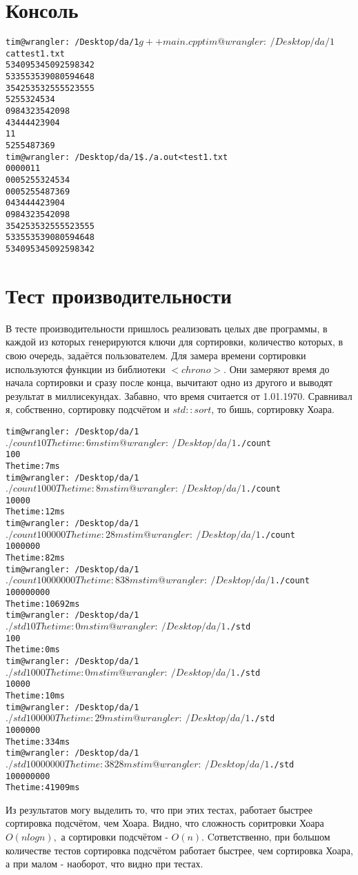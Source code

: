 \documentclass{article}
\begin{document}
\section{Консоль}
\begin{alltt}
tim@wrangler:~/Desktop/da/1$ g++ main.cpp 
tim@wrangler:~/Desktop/da/1$ cat test1.txt 
534095 345092598342
533553 539080594648
354253 532555523555
525 5324534
098432 3542098
43444 423904
1 1
525 5487369
tim@wrangler:~/Desktop/da/1\$ ./a.out < test1.txt 
000001    1
000525    5324534
000525    5487369
043444    423904
098432    3542098
354253    532555523555
533553    539080594648
534095    345092598342
\end{alltt}
\pagebreak
\section{Тест производительности}
В тесте производительности пришлось реализовать целых две программы, в каждой из которых генерируются ключи для сортировки, количество которых, в свою очередь, задаётся пользователем. Для замера времени сортировки используются функции из библиотеки $<chrono>$. Они замеряют время до начала сортировки и сразу после конца, вычитают одно из другого и выводят результат в миллисекундах. Забавно, что время считается от 1.01.1970. Сравнивал я, собственно, сортировку подсчётом и $std::sort$, то бишь, сортировку Хоара.

\begin{alltt}
tim@wrangler:~/Desktop/da/1$ ./count
10
The time: 6 ms
tim@wrangler:~/Desktop/da/1$ ./count
100
The time: 7 ms
tim@wrangler:~/Desktop/da/1$ ./count
1000
The time: 8 ms
tim@wrangler:~/Desktop/da/1$ ./count
10000
The time: 12 ms
tim@wrangler:~/Desktop/da/1$ ./count
100000
The time: 28 ms
tim@wrangler:~/Desktop/da/1$ ./count
1000000
The time: 82 ms
tim@wrangler:~/Desktop/da/1$ ./count
10000000
The time: 838 ms
tim@wrangler:~/Desktop/da/1$ ./count
100000000
The time: 10692 ms
tim@wrangler:~/Desktop/da/1$ ./std 
10
The time: 0 ms
tim@wrangler:~/Desktop/da/1$ ./std 
100
The time: 0 ms
tim@wrangler:~/Desktop/da/1$ ./std 
1000
The time: 0 ms
tim@wrangler:~/Desktop/da/1$ ./std 
10000
The time: 10 ms
tim@wrangler:~/Desktop/da/1$ ./std 
100000
The time: 29 ms
tim@wrangler:~/Desktop/da/1$ ./std 
1000000
The time: 334 ms
tim@wrangler:~/Desktop/da/1$ ./std 
10000000
The time: 3828 ms
tim@wrangler:~/Desktop/da/1$ ./std 
100000000
The time: 41909 ms
\end{alltt}

Из результатов могу выделить то, что при этих тестах, работает быстрее сортировка подсчётом, чем Хоара. Видно, что сложность соритровки Хоара $O(nlogn),$ а сортировки подсчётом - $O(n)$. Cответственно, при большом количестве тестов сортировка подсчётом работает быстрее, чем сортировка Хоара, а при малом - наоборот, что видно при тестах.
\end{document}
